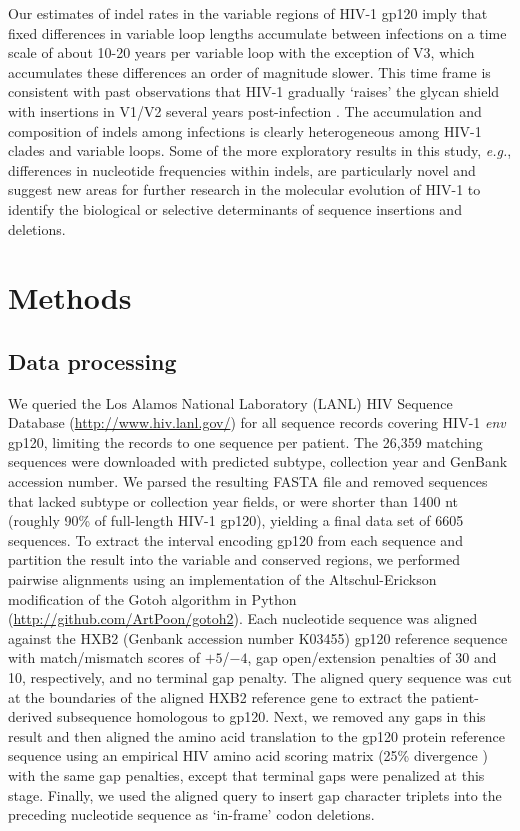 \documentclass[12pt]{article}
\begin{document}
Our estimates of indel rates in the variable regions of HIV-1 gp120 imply that fixed differences in variable loop lengths accumulate between infections on a time scale of about 10-20 years per variable loop with the exception of V3, which accumulates these differences an order of magnitude slower.
This time frame is consistent with past observations that HIV-1 gradually `raises' the glycan shield with insertions in V1/V2 several years post-infection \citep{Sagar:2006}.
The accumulation and composition of indels among infections is clearly heterogeneous among HIV-1 clades and variable loops.
Some of the more exploratory results in this study, \textit{e.g.}, differences in nucleotide frequencies within indels, are particularly novel and suggest new areas for further research in the molecular evolution of HIV-1 to identify the biological or selective determinants of sequence insertions and deletions.


\section * {Methods}


\subsection * {Data processing} 

We queried the Los Alamos National Laboratory (LANL) HIV Sequence Database (\url{http://www.hiv.lanl.gov/}) for all sequence records covering HIV-1 \textit{env} gp120, limiting the records to one sequence per patient.
The 26,359 matching sequences were downloaded with predicted subtype, collection year and GenBank accession number.
We parsed the resulting FASTA file and removed sequences that lacked subtype or collection year fields, or were shorter than 1400 nt (roughly 90\% of full-length HIV-1 gp120), yielding a final data set of 6605 sequences.
To extract the interval encoding gp120 from each sequence and partition the result into the variable and conserved regions, we performed pairwise alignments using an implementation of the Altschul-Erickson \citep{altschul1986optimal} modification of the Gotoh algorithm in Python (\url{http://github.com/ArtPoon/gotoh2}).
Each nucleotide sequence was aligned against the HXB2 (Genbank accession number K03455) gp120 reference sequence with match/mismatch scores of $+5$/$-4$, gap open/extension penalties of 30 and 10, respectively, and no terminal gap penalty.
The aligned query sequence was cut at the boundaries of the aligned HXB2 reference gene to extract the patient-derived subsequence homologous to gp120.
Next, we removed any gaps in this result and then aligned the amino acid translation to the gp120 protein reference sequence using an empirical HIV amino acid scoring matrix (25\% divergence \citep{nickle2007hiv}) with the same gap penalties, except that terminal gaps were penalized at this stage.
Finally, we used the aligned query to insert gap character triplets into the preceding nucleotide sequence as `in-frame' codon deletions.
\end{document}
